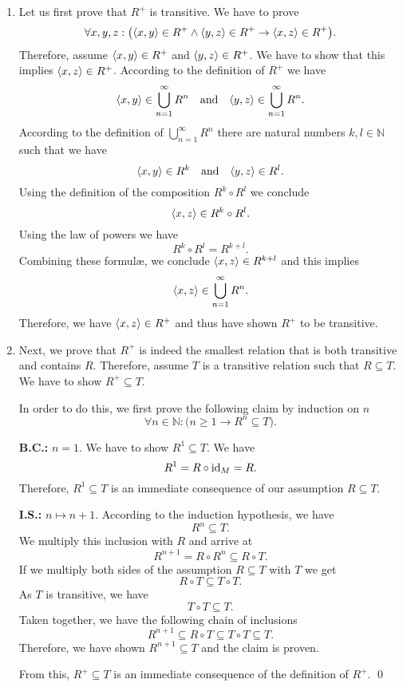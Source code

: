 \begin{enumerate}
\item Let us first prove that $R^+$ is transitive.  We have to prove
\[ \forall x, y, z: 
   \bigl(\pair(x,y) \in R^+ \wedge \pair(y,z) \in R^+ \rightarrow \pair(x,z) \in   R^+\bigr). 
\]
Therefore, assume  $\pair(x,y) \in R^+$ and $\pair(y,z) \in R^+$.  We have to show
that this implies  $\pair(x,z) \in R^+$.  According to the definition of  $R^+$ we have
\[ \pair(x,y) \in \bigcup\limits_{n=1}^{\infty} R^n \quad \mbox{and} \quad
   \pair(y,z) \in \bigcup\limits_{n=1}^{\infty} R^n.
\]
According to the definition of  $\bigcup\limits_{n=1}^{\infty} R^n$ there are natural
numbers  $k,l\in\mathbb{N}$ such that we have
\[ \pair(x,y) \in R^k \quad \mbox{and} \quad \pair(y,z) \in R^l. \]
Using the definition of the composition $R^k \circ R^l$ we conclude
\[  \pair(x,z) \in R^k \circ R^l. \]
Using the law of powers we have 
\[ R^k \circ R^l = R^{k+l}. \]
Combining these {formul\ae}, we conclude $\pair(x,z) \in R^{k+l}$ and this implies
\[  \pair(x,z) \in \bigcup\limits_{n=1}^{\infty} R^n. \]
Therefore,  we have $\pair(x,z) \in R^+$ and thus have shown $R^+$ to be transitive. 

\item Next, we prove that $R^+$ is indeed the smallest  relation that is both transitive
      and contains $R$.  Therefore, assume  $T$ is a transitive relation such that
      $R \subseteq T$.  We have to show  $R^+ \subseteq T$.

      In order to do this, we first prove the following claim by induction on $n$
      \[ \forall n \in \mathbb{N}: \bigl(n \geq 1 \rightarrow R^n \subseteq T\bigr). \]

      \textbf{B.C.:} $n=1$.  We have to show  $R^1 \subseteq T$.  We have
      \[ R^1 = R \circ \textrm{id}_M = R. \]
      Therefore, $R^1 \subseteq T$ is an immediate consequence of our assumption $R \subseteq T$.

      \textbf{I.S.:} $n \mapsto n+1$.  According to the induction hypothesis, we have
      \[ R^n \subseteq T. \]
      We  multiply this inclusion with $R$ and arrive at
      \[ R^{n+1} = R \circ R^n \subseteq R \circ T. \]
      If we multiply both sides of the assumption  $R \subseteq T$ with $T$ we get
      \[ R \circ T \subseteq T \circ T. \]
      As $T$ is transitive, we have 
      \[ T \circ T \subseteq T. \]
      Taken together, we have the following chain of inclusions
      \[ R^{n+1} \subseteq R \circ T \subseteq T \circ T \subseteq T. \]
      Therefore, we have shown $R^{n+1} \subseteq T$ and the claim is proven.

      From this, $R^+ \subseteq T$ is an immediate consequence of the definition of
      $R^+$.  \qed
\end{enumerate}

